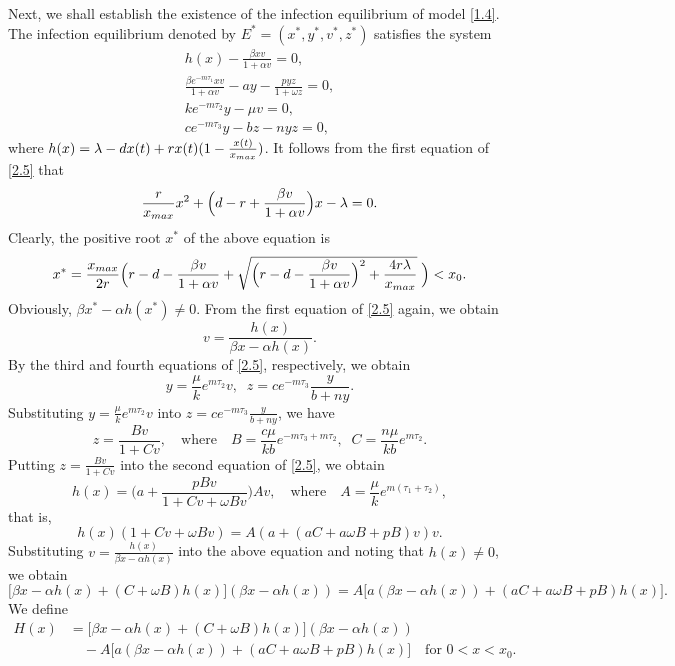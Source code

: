 \documentclass[10pt,a4paper]{amsart}
\numberwithin{equation}{section}
\begin{document}
Next, we shall establish the existence of  the infection equilibrium of model 
\eqref{1.4}. The infection equilibrium denoted by $E^{*}=(x^{*},y^{*},v^{*},z^{*})$ 
satisfies the system
 \begin{equation} \label{2.5}
 \begin{gathered}
 h(x)-{\frac{\beta xv}{1+\alpha v}}=0,\\
 {\frac{\beta e^{-m\tau_1}xv}{1+\alpha v}}-ay-{\frac{pyz}{1+\omega z}}=0,\\
 k e^{-m\tau_2}y-\mu v=0,\\
 ce^{-m\tau_3}y-bz-nyz=0,
\end{gathered}
\end{equation}
where $h(x)= \lambda-dx(t)+rx(t)(1-\frac{x(t)}{x_{\rm max}})$.
It follows from  the first equation of \eqref{2.5} that
$$
\frac{r}{x_{\rm max}}x^2+\Big(d-r+\frac{\beta v}{1+\alpha v}\Big)x -\lambda=0.
$$
Clearly, the positive root $x^*$ of the above equation is
$$
x^*=\frac{x_{\rm max}}{2r}
\Big(r-d-\frac{\beta v}{1+\alpha v}+\sqrt{\Big(r-d-\frac{\beta v}{1+\alpha v}
\Big)^{2}+\frac{4r\lambda}{x_{\rm max}}}\;\Big)<x_0.
$$
Obviously, $\beta x^*-\alpha h(x^*)\not=0$.  From the first equation
of \eqref{2.5} again, we obtain
\[
v=\frac{h(x)}{\beta x-\alpha h(x)}.
\]
By the third and fourth equations of  \eqref{2.5}, respectively,  we obtain
$$
y=\frac{\mu }{k}e^{m\tau_2}v, \;\;z=ce^{-m \tau_3}\frac{y}{b+ny}.
$$
Substituting $y=\frac{\mu}{k}e^{m\tau_2}v$ into $z=ce^{-m \tau_3}\frac{y}{b+ny}$,
we have
\[
z=\frac{Bv}{1+Cv}, \quad \text{where}\quad B=\frac{c\mu}{kb}
e^{-m\tau_3+m\tau_2},\;\; C=\frac{n \mu}{kb} e^{m\tau_2}.
\]
Putting $z=\frac{Bv}{1+Cv}$ into the second equation of \eqref{2.5}, we obtain
\[
h(x)=\Big(a+\frac{pBv}{1+Cv+ \omega Bv}\Big)Av, \quad \text{where}\quad
A=\frac{\mu}{k}e^{m(\tau_1+\tau_2)},
\]
that is,
\[
h(x)(1+Cv+\omega Bv)=A(a+(aC+a\omega B+pB)v)v.
\]
Substituting $v=\frac{h(x)}{\beta x-\alpha h(x)}$ into the above equation
and noting that $h(x)\not=0$, we obtain
\[
\Big[\beta x-\alpha h(x)+(C+\omega B)h(x)\Big]
(\beta x-\alpha h(x))=A\Big[a(\beta x-\alpha h(x))+(aC+a\omega B+pB)h(x)\Big].
\]
We define
\begin{equation} \label{2.6}
\begin{aligned}
H(x)&=  \Big[\beta x-\alpha h(x)+(C+\omega B)h(x)\Big](\beta x-\alpha h(x))    \\
&\quad -A\Big[a(\beta x-\alpha h(x))+(aC+a\omega B+pB)h(x)\Big]\quad
 \text{for } 0<x<x_0.
\end{aligned}
\end{equation}
\end{document}
